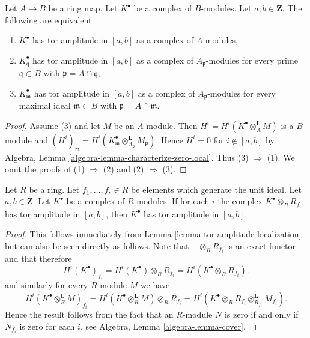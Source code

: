 \begin{lemma}
\label{lemma-tor-amplitude-localization}
Let $A  \to B$ be a ring map. Let $K^\bullet$ be a complex of $B$-modules.
Let $a, b \in \mathbf{Z}$. The following are equivalent
\begin{enumerate}
\item $K^\bullet$ has tor amplitude in $[a, b]$ as a complex of $A$-modules,
\item $K^\bullet_\mathfrak q$ has tor amplitude in $[a, b]$ as a complex
of $A_\mathfrak p$-modules for every prime $\mathfrak q \subset B$
with $\mathfrak p = A \cap \mathfrak q$,
\item $K^\bullet_\mathfrak m$ has tor amplitude in $[a, b]$ as a complex
of $A_\mathfrak p$-modules for every maximal ideal $\mathfrak m \subset B$
with $\mathfrak p = A \cap \mathfrak m$.
\end{enumerate}
\end{lemma}

\begin{proof}
Assume (3) and let $M$ be an $A$-module. Then
$H^i = H^i(K^\bullet \otimes_A^\mathbf{L} M)$ is a $B$-module and
$(H^i)_\mathfrak m =
H^i(K^\bullet_\mathfrak m \otimes_{A_\mathfrak p}^\mathbf{L} M_\mathfrak p)$.
Hence $H^i = 0$ for $i \not \in [a, b]$ by
Algebra, Lemma \ref{algebra-lemma-characterize-zero-local}. Thus
(3) $\Rightarrow$ (1). We omit the proofs of (1) $\Rightarrow$ (2)
and (2) $\Rightarrow$ (3).
\end{proof}

\begin{lemma}
\label{lemma-glue-tor-amplitude}
Let $R$ be a ring. Let $f_1, \ldots, f_r \in R$ be elements which
generate the unit ideal. Let $a, b \in \mathbf{Z}$. Let $K^\bullet$
be a complex of $R$-modules. If for each $i$ the complex
$K^\bullet \otimes_R R_{f_i}$ has tor amplitude in $[a, b]$,
then $K^\bullet$ has tor amplitude in $[a, b]$.
\end{lemma}

\begin{proof}
This follows immediately from Lemma \ref{lemma-tor-amplitude-localization}
but can also be seen directly as follows.
Note that $- \otimes_R R_{f_i}$ is an exact functor and that therefore
$$
H^i(K^\bullet)_{f_i} =
H^i(K^\bullet) \otimes_R R_{f_i} = H^i(K^\bullet \otimes_R R_{f_i}).
$$
and similarly for every $R$-module $M$ we have
$$
H^i(K^\bullet \otimes_R^{\mathbf{L}} M)_{f_i} =
H^i(K^\bullet \otimes_R^{\mathbf{L}} M) \otimes_R R_{f_i} =
H^i(K^\bullet \otimes_R R_{f_i} \otimes_{R_{f_i}}^{\mathbf{L}} M_{f_i}).
$$
Hence the result follows from the fact that an $R$-module $N$
is zero if and only if $N_{f_i}$ is zero for each $i$, see
Algebra, Lemma \ref{algebra-lemma-cover}.
\end{proof}

